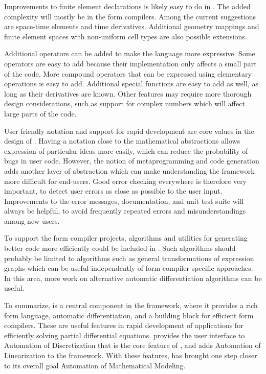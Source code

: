 Improvements to finite element declarations is likely easy to do in
\ufl{}. The added complexity will mostly be in the form compilers.  Among
the current suggestions are space-time elements and time derivatives.
Additional geometry mappings and finite element spaces with non-uniform
cell types are also possible extensions.

Additional operators can be added to make the language more
expressive. Some operators are easy to add because their implementation
only affects a small part of the code.  More compound operators
that can be expressed using elementary operations is easy to add.
Additional special functions are easy to add as well, as long as their
derivatives are known.  Other features may require more thorough design
considerations, such as support for complex numbers which will affect
large parts of the code.

User friendly notation and support for rapid development are core values
in the design of \ufl{}.  Having a notation close to the mathematical
abstractions allows expression of particular ideas more easily, which
can reduce the probability of bugs in user code.  However, the notion
of metaprogramming and code generation adds another layer of abstraction
which can make understanding the framework more difficult for end-users.
Good error checking everywhere is therefore very important, to detect
user errors as close as possible to the user input. Improvements to the
error messages, documentation, and unit test suite will always be helpful,
to avoid frequently repeated errors and misunderstandings among new users.

To support the form compiler projects, algorithms and utilities for
generating better code more efficiently could be included in \ufl{}.
Such algorithms should probably be limited to algorithms such as
general transformations of expression graphs which can be useful
independently of form compiler specific approaches.  In this area,
more work on alternative automatic differentiation algorithms
\citep{ForthTadjouddinePryceEtAl2004,Tadjouddine2008} can be useful.

To summarize, \ufl{} is a central component in the \fenics{} framework,
where it provides a rich form language, automatic differentiation,
and a building block for efficient form compilers.  These are useful
features in rapid development of applications for efficiently solving
partial differential equations.  \ufl{} provides the user interface to
Automation of Discretization that is the core feature of \fenics{},
and adds Automation of Linearization to the framework.  With these
features, \ufl{} has brought \fenics{} one step closer to its overall
goal Automation of Mathematical Modeling.

